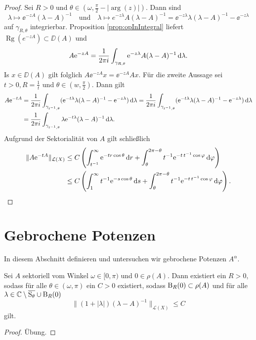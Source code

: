 \begin{proof}
  Sei $R > 0$ und $\theta \in (\omega, \frac{\pi}{2} - |\arg(z)|)$.
  Dann sind
  $$
  \lambda \mapsto \ee^{-zA}(\lambda - A)^{-1} \quad\text{und}\quad \lambda \mapsto e^{-z\lambda} A(\lambda - A)^{-1} = \ee^{-z\lambda} \lambda(\lambda - A)^{-1} - \ee^{-z\lambda}
  $$
  auf $\gamma_{R, \theta}$ integrierbar. Proposition \ref{prop:opInIntegral} liefert $\operatorname{Rg}(e^{-zA}) \subset \DD(A)$ und $$A \mathrm{e}^{-zA} = \frac{1}{2\pi i} \int_{\gamma_{R,\theta}} \mathrm{e}^{-z\lambda} A ( \lambda - A)^{-1} \, {\operatorname{d}\!{\lambda}}.$$
  Is $x \in \DD(A)$ gilt folglich $A \ee^{-zA} x = \ee^{-zA} A x$.
  Für die zweite Aussage sei $t > 0, R = \frac{1}{t}$ und $\theta \in (w, \frac{\pi}{2})$. Dann gilt
  \begin{align*}
    A \mathrm{e}^{-t A}
    &= \frac{1}{2 \pi i} \int_{\gamma_{t^{-1}, \theta}} (\mathrm{e}^{-t\lambda} \lambda (\lambda - A)^{-1} - \mathrm{e}^{-z \lambda}) \, {\operatorname{d}\!{\lambda}} 
    = \frac{1}{2\pi i} \int_{\gamma_{t^{-1}, \theta}} ( \mathrm{e}^{-t \lambda} \lambda (\lambda - A)^{-1} - \mathrm{e}^{-z \lambda})\, {\operatorname{d}\!{\lambda}} \\
    &= \frac{1}{2\pi i} \int_{\gamma_{t^{-1}, \theta}} \lambda \mathrm{e}^{-t \lambda} (\lambda - A)^{-1} \, {\operatorname{d}\!{\lambda}}.
  \end{align*}
  Aufgrund der Sektorialität von $A$ gilt schließlich
  \begin{align*}
    \|A \mathrm{e}^{-t A} \|_{\mathcal{L}(X)}
    &\leq C \left( \int_{t^{-1}}^\infty \mathrm{e}^{-tr \cos \theta} \, {\operatorname{d}\!{r}} + \int_\theta^{2\pi - \theta} t^{-1} \mathrm{e}^{-t\, t^{-1}\cos \varphi} \, {\operatorname{d}\!{\varphi}} \right) \\
    &\leq C \left( \int_1^\infty t^{-1} \mathrm{e}^{-s \cos \theta} \, {\operatorname{d}\!{s}} + \int_\theta^{2\pi - \theta} t^{-1} \mathrm{e}^{-t\, t^{-1}\cos \varphi} \, {\operatorname{d}\!{\varphi}} \right). \qedhere
  \end{align*}
\end{proof}

\section{Gebrochene Potenzen}

In diesem Abschnitt definieren und untersuchen wir gebrochene Potenzen $A^\alpha$.

\begin{prop}
  Sei $A$ sektoriell vom Winkel $\omega \in [0,\pi)$ und $0 \in \rho(A)$.
    Dann existiert ein $R > 0$, sodass für alle $\theta \in (\omega, \pi)$ ein $C > 0$ existiert, sodass $\mathrm{B}_R(0) \subset \rho(A)$ und für alle $\lambda \in \mathbb{C} \setminus \overline{\mathrm{S}_\theta} \cup \mathrm{B}_R(0)$
    $$
    \| (1 + |\lambda| ) (\lambda - A)^{-1} \|_{\mathcal{L}(X)} \leq C
    $$
    gilt.
\end{prop}

\begin{proof}
  Übung.
\end{proof}


